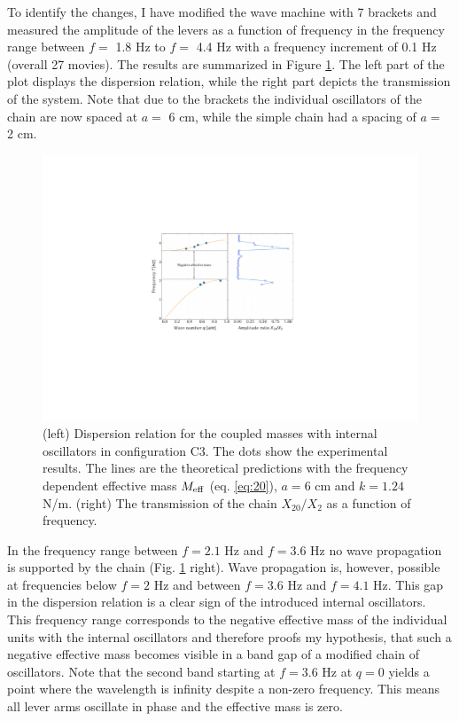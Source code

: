 \documentclass[12pt]{article}
\begin{document}
To identify the changes, I have modified the wave machine with 7 brackets and measured the amplitude of the levers as a function of frequency in the frequency range between $f=$ 1.8 Hz to $f=$ 4.4 Hz with a frequency increment of 0.1 Hz (overall 27 movies).
The results are summarized in Figure \ref{fig:figure20}. The left part of the plot displays the dispersion relation, while the right part depicts the transmission of the system. Note that due to the brackets the individual oscillators of the chain are now spaced at $a=$ 6 cm, while the simple chain had a spacing of $a=$ 2 cm. 
\begin{figure}[hbt]
  \includegraphics[width=.7\columnwidth]{condition3_dispersion_transmission.pdf}
  \caption{(left) Dispersion relation for the coupled masses with internal oscillators in configuration C3. The dots show the experimental results. The lines are the theoretical predictions with the frequency dependent effective mass $M_{\rm eff}$ (eq. \ref{eq:20}), $a=6$ cm and $k=1.24$ N/m. (right) The transmission of the chain $X_{20}/X_{2}$ as a function of frequency.}\label{fig:figure20}
\end{figure}
In the frequency range between $f=2.1$ Hz and $f=3.6$ Hz no wave propagation is supported by the chain (Fig. \ref{fig:figure20} right). Wave propagation is, however, possible at frequencies below $f=2$ Hz and between $f=3.6$ Hz and $f=4.1$ Hz. This gap in the dispersion relation is a clear sign of the introduced internal oscillators. This frequency range corresponds to the negative effective mass of the individual units with the internal oscillators and therefore proofs my hypothesis, that such a negative effective mass becomes visible in a band gap of a modified chain of oscillators. Note that the second band starting at $f=3.6$ Hz at $q=0$ yields a point where the wavelength is infinity despite a non-zero frequency. This means all lever arms oscillate in phase and the effective mass is zero. 
\end{document}

